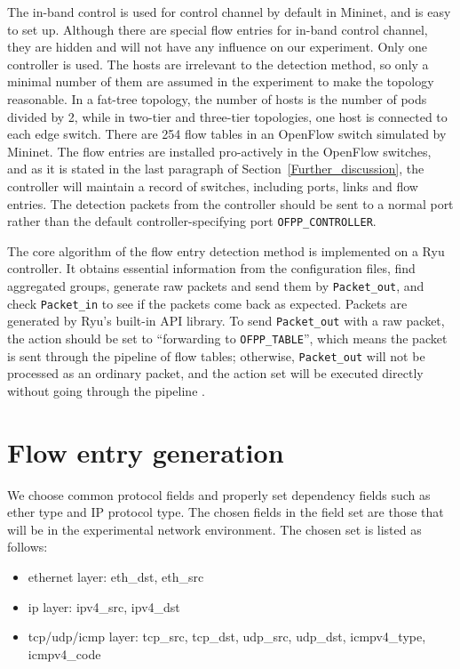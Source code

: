 The in-band control is used for control channel by default in Mininet, and is easy to set up. Although there are special flow entries for in-band control channel, they are hidden and will not have any influence on our experiment. Only one controller is used. The hosts are irrelevant to the detection method, so only a minimal number of them are assumed in the experiment to make the topology reasonable. In a fat-tree topology, the number of hosts is the number of pods divided by 2, while in two-tier and three-tier topologies, one host is connected to each edge switch. There are 254 flow tables in an OpenFlow switch simulated by Mininet. The flow entries are installed pro-actively in the OpenFlow switches, and as it is stated in the last paragraph of Section~\ref{Further_discussion}, the controller will maintain a record of switches, including ports, links and flow entries. The detection packets from the controller should be sent to a normal port rather than the default controller-specifying port \texttt{OFPP\_CONTROLLER}.

The core algorithm of the flow entry detection method is implemented on a Ryu controller. It obtains essential information from the configuration files, find aggregated groups, generate raw packets and send them by \texttt{Packet\_out}, and check \texttt{Packet\_in} to see if the packets come back as expected. Packets are generated by Ryu's built-in API library. To send \texttt{Packet\_out} with a raw packet, the action should be set to ``forwarding to \texttt{OFPP\_TABLE}'', which means the packet is sent through the pipeline of flow tables; otherwise, \texttt{Packet\_out} will not be processed as an ordinary packet, and the action set will be executed directly without going through the pipeline \cite{PACKETOUT}. 

\section{Flow entry generation}
\label{flow_entry_generation}
We choose common protocol fields and properly set dependency fields such as ether type and IP protocol type. The chosen fields in the field set are those that will be in the experimental network environment. The chosen set is listed as follows:

\begin{itemize}
\item
ethernet layer: eth\_dst, eth\_src
\item
ip layer: ipv4\_src, ipv4\_dst
\item
tcp/udp/icmp layer: tcp\_src, tcp\_dst, udp\_src, udp\_dst, icmpv4\_type, icmpv4\_code
\end{itemize}

